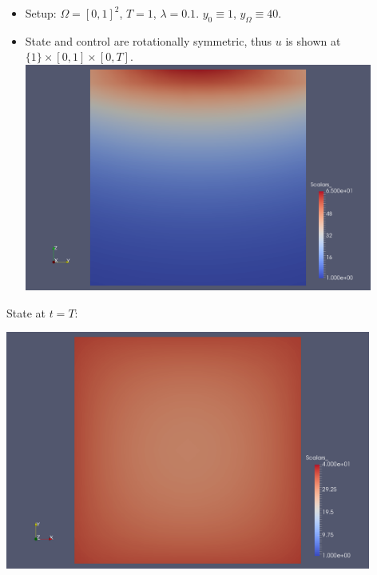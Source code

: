 \documentclass[10pt, USenglish]{beamer}
\begin{document}
\begin{frame}
\begin{itemize}
\item Setup: $\Omega = [0, 1]^2$, $T = 1$, $\lambda = 0.1$. $y_0 \equiv 1$, $y_\Omega \equiv 40$.
\item State and control are rotationally symmetric, thus $u$ is shown at $\{ 1 \} \times [0, 1] \times [0, T]$.
\includegraphics[width=0.9\textwidth]{../thesis/Images/boundary-const-u.png}
\end{itemize}
\end{frame}

\begin{frame}
State at $t = T$:
\begin{center}
\includegraphics[width=0.9\textwidth]{../thesis/Images/boundary-const-y-endtime.png}
\end{center}
\end{frame}
\end{document}
